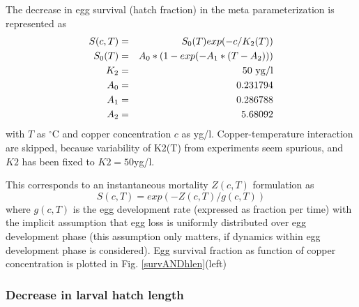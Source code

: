 The decrease in egg survival (hatch fraction) in the meta parameterization is represented as 
\begin{eqnarray*}
          S(c,T) & = & S_0(T) exp(- c / K_2(T))  \\
          S_0(T)  & = & A_0*(1 - exp(-A_1*(T-A_2)))\\
          K_2     & = & 50 {\ \rm yg/l} \\
	  A_0     & = & 0.231794 \\
          A_1     & = & 0.286788 \\
          A_2     & = & 5.68092  \\
\end{eqnarray*}
with $T$ as $^\circ$C and copper concentration $c$ as yg/l.
Copper-temperature interaction are skipped, because variability of K2(T)
from experiments seem spurious, and $K2$ has been fixed to $K2  = 50 $yg/l.

This corresponds to an instantaneous mortality $Z(c,T)$ formulation as 
\begin{equation}
           S(c,T) =  exp( -Z(c,T)/g(c,T) ) \nonumber
\end{equation}
where $g(c,T)$ is the egg development rate (expressed as fraction per time) with the
implicit assumption that egg loss is uniformly distributed over egg development phase
(this assumption only matters, if dynamics within egg development phase is considered).
Egg survival fraction as function of copper concentration is plotted in Fig. \ref{survANDhlen}(left)
\subsubsection{Decrease in larval hatch length} 

